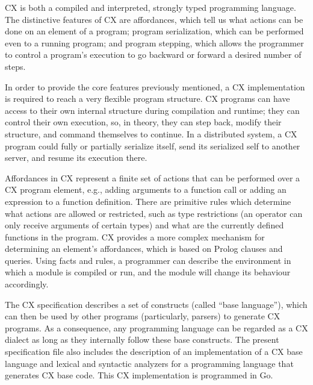 \label{historysection}

CX is both a compiled and interpreted, strongly typed programming
language. The distinctive features of CX are
affordances, which tell us what actions can be done on an element of a
program; program serialization, which can be performed even to a running
program; and program stepping, which allows the programmer to control
a program's execution to go backward or forward a desired number of steps.

In order to provide the core features previously mentioned, a CX
implementation is required to reach a very flexible program
structure. CX programs can have access to their own internal structure during
compilation and runtime; they can control their own execution, so, in
theory, they can step back, modify their structure, and command
themselves to continue. In a distributed system, a CX program could
fully or partially serialize itself, send its serialized self to another
server, and resume its execution there.

Affordances in CX represent a finite set of actions that can be
performed over a CX program element, e.g., adding arguments to a
function call or adding an expression to a function definition. There are
primitive rules which determine what actions are allowed or
restricted, such as type restrictions (an operator can only receive
arguments of certain types) and what are the currently defined
functions in the program. CX provides a more complex mechanism for
determining an element's affordances, which is based on Prolog clauses
and queries. Using facts and rules, a programmer can describe the environment in
which a module is compiled or run, and the module will change its behaviour
accordingly.



The CX specification describes a set of constructs (called ``base
language''), which can then be used by other programs (particularly,
parsers) to generate CX programs. As a consequence, any programming
language can be regarded as a CX dialect as long as they internally follow
these base constructs. The present specification file also includes
the description of an implementation of a CX base language and 
lexical and syntactic analyzers for a programming language that
generates CX base code. This CX implementation is programmed in Go.







